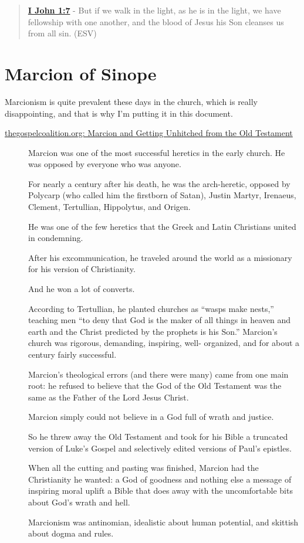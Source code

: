 \documentclass[11pt]{article}
\begin{document}
\begin{quote}
\textbf{\href{https://www.biblegateway.com/passage/?search=1\%20John\%201\%3A7\&version=ESV}{I John 1:7}} - But if we walk in the light, as he is in the light, we have fellowship with one another, and the blood of Jesus his Son cleanses us from all sin. (ESV)
\end{quote}

\section{Marcion of Sinope}
\label{sec:org506824f}
Marcionism is quite prevalent these days in
the church, which is really disappointing, and
that is why I'm putting it in this document.

\begin{description}
\item[{\href{https://www.thegospelcoalition.org/blogs/kevin-deyoung/marcion-getting-unhitched-old-testament/}{thegospelcoalition.org: Marcion and Getting Unhitched from the Old Testament}}] Marcion was one of the most successful heretics in the early church.
He was opposed by everyone who was anyone.

For nearly a century after his death, he was
the arch-heretic, opposed by Polycarp (who
called him the firstborn of Satan), Justin
Martyr, Irenaeus, Clement, Tertullian,
Hippolytus, and Origen.

He was one of the few heretics that the Greek
and Latin Christians united in condemning.

After his excommunication, he traveled around
the world as a missionary for his version of
Christianity.

And he won a lot of converts.

According to Tertullian, he planted churches
as “wasps make nests,” teaching men “to deny
that God is the maker of all things in heaven
and earth and the Christ predicted by the
prophets is his Son.” Marcion’s church was
rigorous, demanding, inspiring, well-
organized, and for about a century fairly
successful.

Marcion’s theological errors (and there were
many) came from one main root: he refused to
believe that the God of the Old Testament was
the same as the Father of the Lord Jesus
Christ.

Marcion simply could not believe in a God full
of wrath and justice.

So he threw away the Old Testament and took
for his Bible a truncated version of Luke’s
Gospel and selectively edited versions of
Paul’s epistles.

When all the cutting and pasting was finished,
Marcion had the Christianity he wanted: a God
of goodness and nothing else a message of
inspiring moral uplift a Bible that does away
with the uncomfortable bits about God’s wrath
and hell.

Marcionism was antinomian, idealistic about
human potential, and skittish about dogma and
rules.
\end{description}
\end{document}
